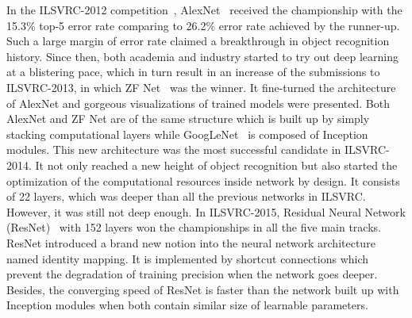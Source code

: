 In the ILSVRC-2012 competition~\parencite{RN205}, AlexNet~\parencite{RN65}
received the championship with the 15.3\% top-5 error rate comparing to
26.2\% error rate achieved by the runner-up.
Such a large margin of error rate claimed a breakthrough in
object recognition history.
Since then, both academia and industry started to try out deep learning
at a blistering pace, which in turn result in an increase of 
the submissions to ILSVRC-2013, in which ZF Net~\parencite{RN66}
was the winner.
It fine-turned the architecture of AlexNet and
gorgeous visualizations of trained models were presented.
Both AlexNet and ZF Net are of the same structure which is built up
by simply stacking computational layers while GoogLeNet~\parencite{RN60}
is composed of Inception
modules.
This new architecture was the most successful candidate in ILSVRC-2014.
It not only reached a new height of object recognition but also 
started the optimization of the computational resources inside network by design.
It consists of 22 layers, which was deeper than all the previous
networks in ILSVRC\@.
However, it was still not deep enough.
In ILSVRC-2015, Residual Neural Network (ResNet)~\parencite{RN67} with
152 layers won the championships in all the five main tracks.
ResNet introduced a brand new notion into the neural network architecture
named identity mapping.
It is implemented by shortcut connections which prevent the degradation of
training precision when the network goes deeper.
Besides, the converging speed of ResNet is faster than the network built up
with Inception modules when both contain similar size of learnable parameters.

